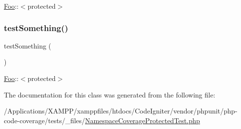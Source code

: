 \mbox{\hyperlink{class_foo}{Foo}}\+:\+:$<$protected$>$ \mbox{\label{class_namespace_coverage_protected_test_a0fc4e17369bc9607ebdd850d9eda8167}} 
\subsubsection{\texorpdfstring{test\+Something()}{testSomething()}\hspace{0.1cm}{\footnotesize\ttfamily [2/2]}}
{\footnotesize\ttfamily test\+Something (\begin{DoxyParamCaption}{ }\end{DoxyParamCaption})}

\mbox{\hyperlink{class_foo}{Foo}}\+:\+:$<$protected$>$ 

The documentation for this class was generated from the following file\+:\begin{DoxyCompactItemize}
\item 
/\+Applications/\+X\+A\+M\+P\+P/xamppfiles/htdocs/\+Code\+Igniter/vendor/phpunit/php-\/code-\/coverage/tests/\+\_\+files/\mbox{\hyperlink{php-code-coverage_2tests_2__files_2_namespace_coverage_protected_test_8php}{Namespace\+Coverage\+Protected\+Test.\+php}}\end{DoxyCompactItemize}
